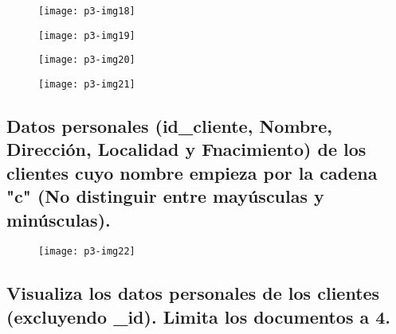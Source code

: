 \documentclass[10pt]{article}
\begin{document}
 \begin{figure}[H]
	\begin{center}
 		\texttt{[image: p3-img18]}
	\end{center} 
\end{figure}

 \begin{figure}[H]
	\begin{center}
 		\texttt{[image: p3-img19]}
	\end{center} 
\end{figure}

 \begin{figure}[H]
	\begin{center}
 		\texttt{[image: p3-img20]}
	\end{center} 
\end{figure}

 \begin{figure}[H]
	\begin{center}
 		\texttt{[image: p3-img21]}
	\end{center} 
\end{figure}


\subsection{Datos personales (id\_cliente, Nombre, Dirección, Localidad y Fnacimiento) de los clientes cuyo nombre empieza por la cadena "c" (No distinguir entre mayúsculas y minúsculas).}

 \begin{figure}[H]
	\begin{center}
 		\texttt{[image: p3-img22]}
	\end{center} 
\end{figure}


\subsection{Visualiza los datos personales de los clientes (excluyendo \_id). Limita los documentos a 4.}
\end{document}
